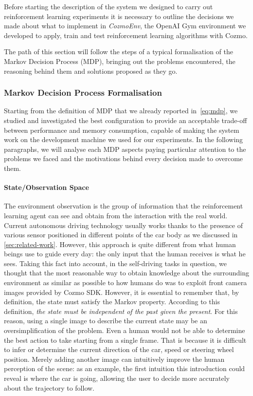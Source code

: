 Before starting the description of the system we designed to carry out reinforcement learning experiments it is necessary to outline the decisions we made about what to implement in \textit{CozmoEnv}, the OpenAI Gym environment we developed to apply, train and test reinforcement learning algorithms with Cozmo.

The path of this section will follow the steps of a typical formalisation of the Markov Decision Process (MDP), bringing out the problems encountered, the reasoning behind them and solutions proposed as they go.

\subsubsection{Markov Decision Process Formalisation} \label{subsubsec:mdp_form}

Starting from the definition of MDP that we already reported in~\vref{eq:mdp}, we studied and investigated the best configuration to provide an acceptable trade-off between performance and memory consumption, capable of making the system work on the development machine we used for our experiments.
In the following paragraphs, we will analyse each MDP aspects paying particular attention to the problems we faced and the motivations behind every decision made to overcome them.

\paragraph{State/Observation Space}
The environment observation is the group of information that the reinforcement learning agent can see and obtain from the interaction with the real world.
Current autonomous driving technology usually works thanks to the presence of various sensor positioned in different points of the car body as we discussed in \vref{sec:related-work}.
However, this approach is quite different from what human beings use to guide every day: the only input that the human receives is what he sees.
Taking this fact into account, in the self-driving tasks in question, we thought that the most reasonable way to obtain knowledge about the surrounding environment as similar as possible to how humans do was to exploit front camera images provided by Cozmo SDK.
However, it is essential to remember that, by definition, the state must satisfy the Markov property.
According to this definition, \textit{the state must be independent of the past given the present}.
For this reason, using a single image to describe the current state may be an oversimplification of the problem.
Even a human would not be able to determine the best action to take starting from a single frame.
That is because it is difficult to infer or determine the current direction of the car, speed or steering wheel position.
Merely adding another image can intuitively improve the human perception of the scene: as an example, the first intuition this introduction could reveal is where the car is going, allowing the user to decide more accurately about the trajectory to follow.


